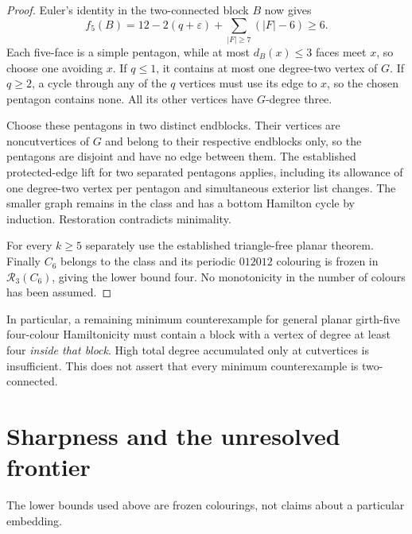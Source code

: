 \documentclass[11pt]{article}
\theoremstyle{remark}
\newcommand{\R}{\mathcal R}
\numberwithin{equation}{section}
\numberwithin{table}{section}
\begin{document}
\begin{proof}
Euler's identity in the two-connected block $B$ now gives
\[
 f_5(B)=12-2(q+\varepsilon)+\sum_{|F|\ge7}(|F|-6)\ge6.
\]
Each five-face is a simple pentagon, while at most $d_B(x)\le3$
faces meet $x$, so choose one avoiding $x$. If $q\le1$, it contains
at most one degree-two vertex of $G$. If $q\ge2$, a cycle through
any of the $q$ vertices must use its edge to $x$, so the chosen
pentagon contains none. All its other vertices have $G$-degree three.

Choose these pentagons in two distinct endblocks. Their vertices
are noncutvertices of $G$ and belong to their respective endblocks
only, so the pentagons are disjoint and have no edge between them.
The established protected-edge lift for two separated pentagons
applies, including its allowance of one degree-two vertex per
pentagon and simultaneous exterior list changes. The smaller graph
remains in the class and has a bottom Hamilton cycle by induction.
Restoration contradicts minimality.

For every $k\ge5$ separately use the established triangle-free
planar theorem. Finally $C_6$ belongs to the class and its periodic
$012012$ colouring is frozen in $\R_3(C_6)$, giving the lower bound
four. No monotonicity in the number of colours has been assumed.
\end{proof}
In particular, a remaining minimum counterexample for general
planar girth-five four-colour Hamiltonicity must contain a block
with a vertex of degree at least four \emph{inside that block}.
High total degree accumulated only at cutvertices is insufficient.
This does not assert that every minimum counterexample is two-connected.

\section{Sharpness and the unresolved frontier}
\label{sec:sharpness}

The lower bounds used above are frozen colourings, not claims about a particular embedding.
\end{document}
